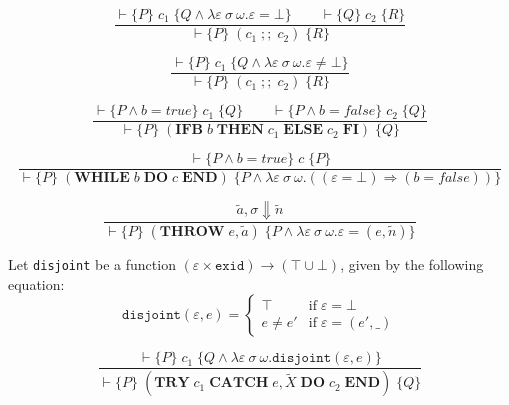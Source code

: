 \begin{equation}\label{eqn:hoare-seq}
\frac{\vdash \{P\} \; c_1 \; \{Q \wedge \lambda \varepsilon\:\sigma\:\omega. \varepsilon = \bot\} \qquad \vdash \{Q\} \; c_2 \; \{R\}}{\vdash \{P\} \; (c_1\; ;;\; c_2) \; \{R\}}
\end{equation}

\begin{equation}\label{eqn:hoare-seq-exn}
\frac{\vdash \{P\} \; c_1 \; \{Q \wedge \lambda \varepsilon\:\sigma\:\omega. \varepsilon \neq \bot\}}{\vdash \{P\} \; (c_1\; ;;\; c_2) \; \{R\}}
\end{equation}

\begin{equation}
\frac{\vdash \{P \wedge b=true\} \; c_1 \; \{Q\} \qquad \vdash \{P \wedge b=false\} \; c_2 \; \{Q\}}{\vdash \{P\} \; (\textbf{IFB}\; b\; \textbf{THEN}\; c_1\; \textbf{ELSE}\; c_2\; \textbf{FI}) \; \{Q\}}
\end{equation}

\begin{equation}
\frac{\vdash \{P \wedge b = true\} \; c \; \{P\}}{\vdash \{P\} \; (\textbf{WHILE}\; b\; \textbf{DO}\; c\; \textbf{END}) \; \{P \wedge \lambda \varepsilon\:\sigma\:\omega.((\varepsilon = \bot) \Rightarrow (b = false))\}}
\end{equation}

\begin{equation}\label{eqn:hoare-throw}
\frac{\tilde{a}, \sigma \Downarrow \tilde{n}}{\vdash \{P\} \; (\textbf{THROW}\; e, \tilde{a}) \; \{P \wedge \lambda \varepsilon\:\sigma\:\omega. \varepsilon = (e, \tilde{n})\}}
\end{equation}

\begin{defn}
Let \verb|disjoint| be a function $(\varepsilon\times\texttt{exid})\rightarrow(\top\cup\bot)$, given by the following equation:
\begin{equation}
\texttt{disjoint}(\varepsilon, e) = \begin{cases}
\top & \mbox{if} \; \varepsilon = \bot \\
e \neq e' & \mbox{if} \; \varepsilon = (e', \_)
\end{cases}
\end{equation}
\end{defn}

\begin{equation}\label{eqn:hoare-try}
\frac{\vdash \{P\} \; c_1 \; \{Q \wedge \lambda \varepsilon\:\sigma\:\omega. \texttt{disjoint}(\varepsilon, e)\}}{\vdash \{P\} \; (\textbf{TRY}\; c_1\; \textbf{CATCH}\; e, \tilde{X}\; \textbf{DO}\; c_2\; \textbf{END}) \; \{Q\}}
\end{equation}


